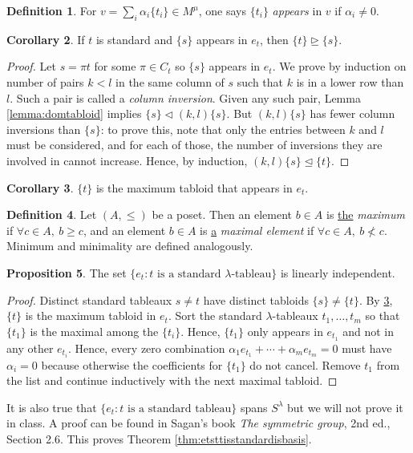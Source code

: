 \documentclass{article}
\theoremstyle{definition}
\newtheorem{defn}{Definition}[subsection]
\newtheorem{prop}[defn]{Proposition}
\newtheorem{coro}[defn]{Corollary}
\begin{document}
\begin{defn}
For $v=\sum_i \alpha_i\{t_i\}\in M^\mu$, one says $\{t_i\}$ \textit{appears} in $v$ if $\alpha_i\neq 0$.
\end{defn}

\begin{coro}
If $t$ is standard and $\{s\}$ appears in $e_t$, then $\{t\}\unrhd\{s\}$.
\end{coro}
\begin{proof}
Let $s=\pi t$ for some $\pi\in C_t$ so $\{s\}$ appears in $e_t$. We prove by induction on number of pairs $k<l$ in the same column of $s$ such that $k$ is in a lower row than $l$. Such a pair is called a \textit{column inversion}. Given any such pair, Lemma \ref{lemma:domtabloid} implies $\{s\}\lhd (k,l)\{s\}$. But $(k,l)\{s\}$ has fewer column inversions than $\{s\}$: to prove this, note that only the entries between $k$ and $l$ must be considered, and for each of those, the number of inversions they are involved in cannot increase. Hence, by induction, $(k,l)\{s\}\unlhd\{t\}$.
\end{proof}

\begin{coro}
\label{coro:tismaxofet}
$\{t\}$ is the maximum tabloid that appears in $e_t$.
\end{coro}
\begin{defn}
Let $(A,\leq)$ be a poset. Then an element $b\in A$ is \underline{the} \textit{maximum} if $\forall c\in A,\ b\geq c$, and an element $b\in A$ is \underline{a} \textit{maximal element} if $\forall c\in A,\ b\not<c$. Minimum and minimality are defined analogously.
\end{defn}

\begin{prop}
The set $\{e_t:t\text{ is a standard }\lambda\text{-tableau}\}$ is linearly independent.
\end{prop}
\begin{proof}
Distinct standard tableaux $s\neq t$ have distinct tabloids $\{s\}\neq \{t\}$. By \ref{coro:tismaxofet}, $\{t\}$ is the maximum tabloid in $e_t$. Sort the standard $\lambda$-tableaux $t_1,\ldots,t_m$ so that $\{t_1\}$ is the maximal among the $\{t_i\}$. Hence, $\{t_1\}$ only appears in $e_{t_1}$ and not in any other $e_{t_i}$. Hence, every zero combination $\alpha_1e_{t_1}+\cdots+\alpha_me_{t_m}=0$ must have $\alpha_i=0$ because otherwise the coefficients for $\{t_1\}$ do not cancel. Remove $t_1$ from the list and continue inductively with the next maximal tabloid.
\end{proof}
It is also true that $\{e_t:t\text{ is a standard tableau}\}$ spans $S^\lambda$ but we will not prove it in class. A proof can be found in Sagan's book \textit{The symmetric group}, 2nd ed., Section 2.6. This proves Theorem \ref{thm:etsttisstandardisbasis}.
\end{document}
